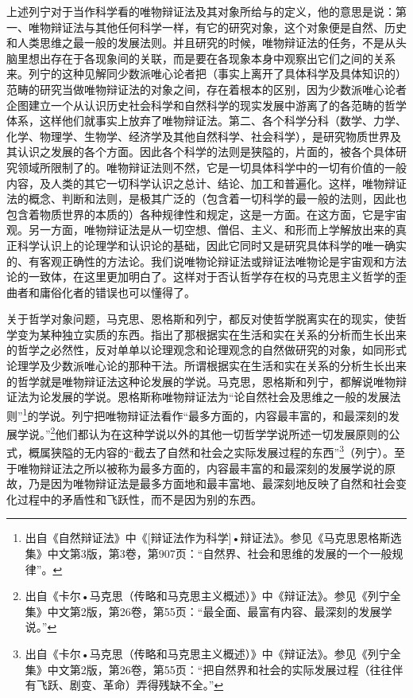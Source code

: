 \documentclass[UTF8, 12pt, a4paper]{ctexrep}
\begin{document}
上述列宁对于当作科学看的唯物辩证法及其对象所给与的定义，他的意思是说：第一、唯物辩证法与其他任何科学一样，有它的研究对象，这个对象便是自然、历史和人类思维之最一般的发展法则。并且研究的时候，唯物辩证法的任务，不是从头脑里想出存在于各现象间的关联，而是要在各现象本身中观察出它们之间的关系来。列宁的这种见解同少数派唯心论者把（事实上离开了具体科学及具体知识的）范畴的研究当做唯物辩证法的对象之间，存在着根本的区别，因为少数派唯心论者企图建立一个从认识历史社会科学和自然科学的现实发展中游离了的各范畴的哲学体系，这样他们就事实上放弃了唯物辩证法。第二、各个科学分科（数学、力学、化学、物理学、生物学、经济学及其他自然科学、社会科学），是研究物质世界及其认识之发展的各个方面。因此各个科学的法则是狭隘的，片面的，被各个具体研究领域所限制了的。唯物辩证法则不然，它是一切具体科学中的一切有价值的一般内容，及人类的其它一切科学认识之总计、结论、加工和普遍化。这样，唯物辩证法的概念、判断和法则，是极其广泛的（包含着一切科学的最一般的法则，因此也包含着物质世界的本质的）各种规律性和规定，这是一方面。在这方面，它是宇宙观。另一方面，唯物辩证法是从一切空想、僧侣、主义、和形而上学解放出来的真正科学认识上的论理学和认识论的基础，因此它同时又是研究具体科学的唯一确实的、有客观正确性的方法论。我们说唯物论辩证法或辩证法唯物论是宇宙观和方法论的一致体，在这里更加明白了。这样对于否认哲学存在权的马克思主义哲学的歪曲者和庸俗化者的错误也可以懂得了。

关于哲学对象问题，马克思、恩格斯和列宁，都反对使哲学脱离实在的现实，使哲学变为某种独立实质的东西。指出了那根据实在生活和实在关系的分析而生长出来的哲学之必然性，反对单单以论理观念和论理观念的自然做研究的对象，如同形式论理学及少数派唯心论的那种干法。所谓根据实在生活和实在关系的分析生长出来的哲学就是唯物辩证法这种论发展的学说。马克思，恩格斯和列宁，都解说唯物辩证法为论发展的学说。恩格斯称唯物辩证法为“论自然社会及思维之一般的发展法则”\footnote{出自《自然辩证法》中《[辩证法作为科学]•辩证法》。参见《马克思恩格斯选集》中文第3版，第3卷，第907页：“自然界、社会和思维的发展的一个一般规律”。}的学说。列宁把唯物辩证法看作“最多方面的，内容最丰富的，和最深刻的发展学说。”\footnote{出自《卡尔•马克思（传略和马克思主义概述）》中《辩证法》。参见《列宁全集》中文第2版，第26卷，第55页：“最全面、最富有内容、最深刻的发展学说。”}他们都认为在这种学说以外的其他一切哲学学说所述一切发展原则的公式，概属狭隘的无内容的“截去了自然和社会之实际发展过程的东西”\footnote{出自《卡尔•马克思（传略和马克思主义概述）》中《辩证法》。参见《列宁全集》中文第2版，第26卷，第55页：“把自然界和社会的实际发展过程（往往伴有飞跃、剧变、革命）弄得残缺不全。”}（列宁）。至于唯物辩证法之所以被称为最多方面的，内容最丰富的和最深刻的发展学说的原故，乃是因为唯物辩证法是最多方面地和最丰富地、最深刻地反映了自然和社会变化过程中的矛盾性和飞跃性，而不是因为别的东西。
\end{document}
